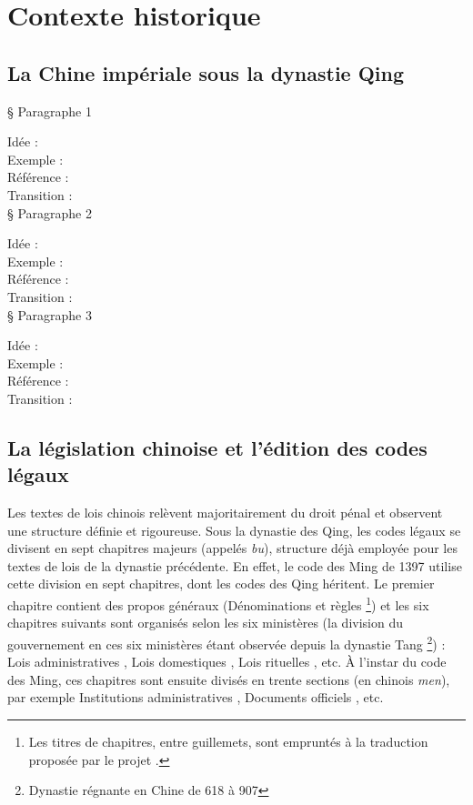 \section{Contexte historique}
    \subsection{La Chine impériale sous la dynastie Qing}

§ Paragraphe 1

Idée :\\
Exemple :\\
Référence :\\
Transition :\\

§ Paragraphe 2

Idée :\\
Exemple :\\
Référence :\\
Transition :\\

§ Paragraphe 3

Idée :\\
Exemple :\\
Référence :\\
Transition :\\

\subsection{La législation chinoise et l’édition des codes légaux}

Les textes de lois chinois relèvent majoritairement du droit pénal et observent une structure définie et rigoureuse. Sous la dynastie des Qing, les codes légaux se divisent en sept chapitres majeurs (appelés \textit{bu}), structure déjà employée pour les textes de lois de la dynastie précédente. En effet, le code des Ming de 1397 utilise cette division en sept chapitres, dont les codes des Qing héritent. Le premier chapitre contient des propos généraux (\og Dénominations et règles \fg \footnote{Les titres de chapitres, entre guillemets, sont empruntés à la traduction proposée par le projet \LSC.}) et les six chapitres suivants sont organisés selon les six ministères (la division du gouvernement en ces six ministères étant observée depuis la dynastie Tang \footnote{Dynastie régnante en Chine de 618 à 907}) : \og Lois administratives \fg, \og Lois domestiques \fg, \og Lois rituelles \fg, etc. À l'instar du code des Ming, ces chapitres sont ensuite divisés en trente sections (en chinois \textit{men}), par exemple \og Institutions administratives \fg, \og Documents officiels \fg, etc. 

